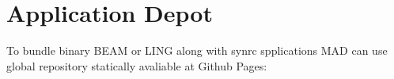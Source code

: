 \documentclass[11pt]{article}
\begin{document}
\section{Application Depot}

To bundle binary BEAM or LING along with synrc spplications MAD
can use global repository statically avaliable at Github Pages:






\qquad

\end{document}
